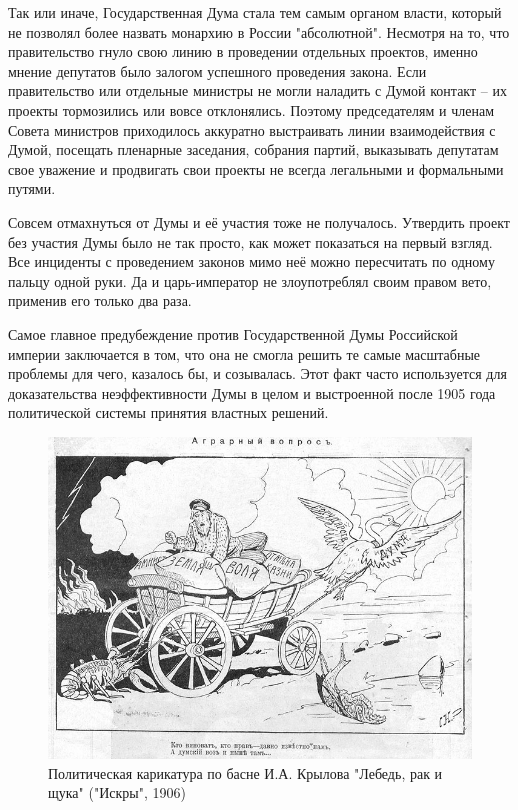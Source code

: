Так или иначе, Государственная Дума стала тем самым органом власти, который не позволял более назвать монархию в России "абсолютной". Несмотря на то, что правительство гнуло свою линию в проведении отдельных проектов, именно мнение депутатов было залогом успешного проведения закона. Если правительство или отдельные министры не могли наладить с Думой контакт – их проекты тормозились или вовсе отклонялись. Поэтому председателям и членам Совета министров приходилось аккуратно выстраивать линии взаимодействия с Думой, посещать пленарные заседания, собрания партий, выказывать депутатам свое уважение и продвигать свои проекты не всегда легальными и формальными путями.

Совсем отмахнуться от Думы и её участия тоже не получалось. Утвердить проект без участия Думы было не так просто, как может показаться на первый взгляд. Все инциденты с проведением законов мимо неё можно пересчитать по одному пальцу одной руки. Да и царь-император не злоупотреблял своим правом вето, применив его только два раза.

Самое главное предубеждение против Государственной Думы Российской империи заключается в том, что она не смогла решить те самые масштабные проблемы для чего, казалось бы, и созывалась. Этот факт часто используется для доказательства неэффективности Думы в целом и выстроенной после 1905 года политической системы принятия властных решений.

\begin{figure}[h!tb] 
	\centering\includegraphics[scale=0.3]{Data/Vybory_V_Dumu/3RTS4AwERjs.jpg}
	\caption{Политическая карикатура по басне И.А. Крылова "Лебедь, рак и щука" ("Искры", 1906)}%
\end{figure}

